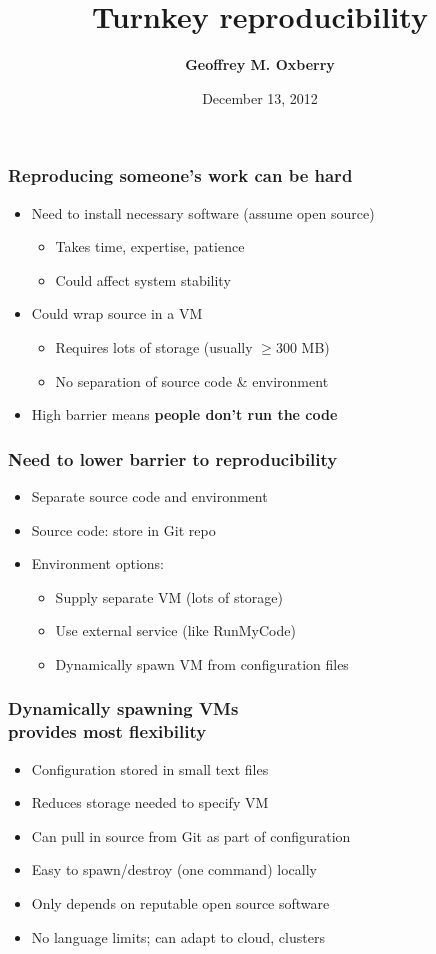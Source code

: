 \documentclass [14pt]{beamer}
\title[Turnkey reproducibility]
{Turnkey reproducibility}
\author[G. Oxberry]
{\textbf{Geoffrey M. Oxberry}}
\institute[LLNL]
{
 Lawrence Livermore National Laboratory \\
Computational Engineering Division \\
Energy Conversion and Storage
}
\date[ICERM 2012]
{December 13, 2012}
\begin{document}
\begin{frame}
\titlepage
\end{frame}

\begin{frame}
\frametitle{Reproducing someone's work can be hard}
\begin{itemize}
\item Need to install necessary software (assume open source)
\begin{itemize}
\item Takes time, expertise, patience
\item Could affect system stability
\end{itemize}
\item Could wrap source in a VM
\begin{itemize}
\item Requires lots of storage (usually $\geq 300$ MB)
\item No separation of source code \& environment
\end{itemize}
\item High barrier means \textbf{people don't run the code}
\end{itemize}
\end{frame}

\begin{frame}
\frametitle{Need to lower barrier to reproducibility}
\begin{itemize}
\item Separate source code and environment
\item Source code: store in Git repo
\item Environment options:
\begin{itemize}
\item Supply separate VM (lots of storage)
\item Use external service (like RunMyCode)
\item Dynamically spawn VM from configuration files
\end{itemize}
\end{itemize}
\end{frame}

\begin{frame}
\frametitle{Dynamically spawning VMs\\ provides most flexibility}
\begin{itemize}
\item Configuration stored in small text files
\item Reduces storage needed to specify VM
\item Can pull in source from Git as part of configuration
\item Easy to spawn/destroy (one command) locally
\item Only depends on reputable open source software
\item No language limits; can adapt to cloud, clusters
\end{itemize}
\end{frame}
\end{document}
